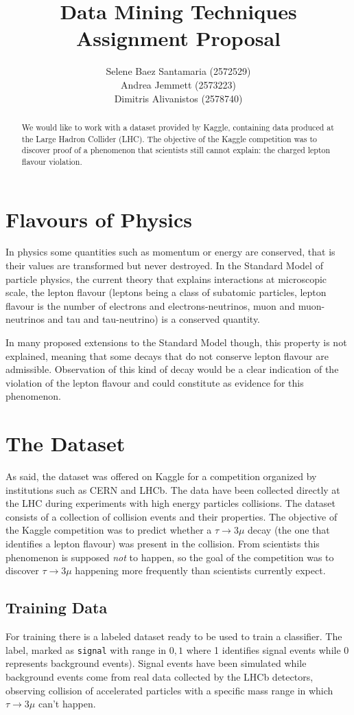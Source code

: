 \documentclass[11pt]{article}
\title{
	{\textbf{Data Mining Techniques} \\ Assignment Proposal}
}
\author{
\footnotesize{Selene Baez Santamaria (2572529)} \\
\footnotesize{Andrea Jemmett (2573223)} \\
\footnotesize{Dimitris Alivanistos (2578740)}
}
\begin{document}
\maketitle

\begin{abstract}
We would like to work with a dataset provided by Kaggle, containing data
produced at the Large Hadron Collider (LHC). The objective of the Kaggle
competition was to discover proof of a phenomenon that scientists still cannot
explain: the charged lepton flavour violation.
\end{abstract}

\section{Flavours of Physics}
In physics some quantities such as momentum or energy are conserved, that is
their values are transformed but never destroyed. In the Standard Model of
particle physics, the current theory that explains interactions at microscopic
scale, the lepton flavour (leptons being a class of subatomic particles, lepton
flavour is the number of electrons and electrons-neutrinos, muon and
muon-neutrinos and tau and tau-neutrino) is a conserved quantity.

In many proposed extensions to the Standard Model though, this property is not
explained, meaning that some decays that do not conserve lepton flavour are
admissible. Observation of this kind of decay would be a clear indication of the
violation of the lepton flavour and could constitute as evidence for this
phenomenon.

\section{The Dataset}
As said, the dataset was offered on Kaggle for a competition organized by
institutions such as CERN and LHCb. The data have been collected directly at the
LHC during experiments with high energy particles collisions. The dataset
consists of a collection of collision events and their properties. The objective
of the Kaggle competition was to predict whether a $\tau \rightarrow 3\mu$ decay
(the one that identifies a lepton flavour) was present in the collision. From
scientists this phenomenon is supposed \emph{not} to happen, so the goal of the
competition was to discover $\tau \rightarrow 3\mu$ happening more frequently
than scientists currently expect.

\subsection{Training Data}
For training there is a labeled dataset ready to be used to train a classifier.
The label, marked as \texttt{signal} with range in ${0,1}$ where 1 identifies
signal events while 0 represents background events). Signal events have been
simulated while background events come from real data collected by the LHCb
detectors, observing collision of accelerated particles with a specific mass
range in which $\tau \rightarrow 3\mu$ can't happen.
\end{document}
